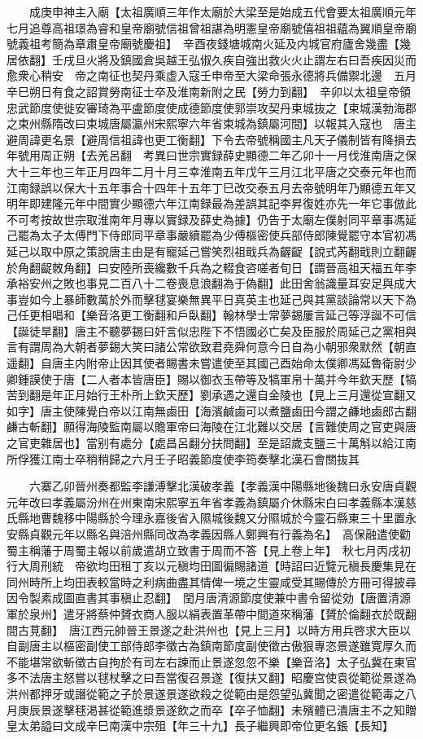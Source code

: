 　　成庚申神主入廟【太祖廣順三年作太廟於大梁至是始成五代會要太祖廣順元年七月追尊高祖璟為睿和皇帝廟號信祖曾祖諶為明憲皇帝廟號僖祖祖藴為翼順皇帝廟號義祖考簡為章肅皇帝廟號慶祖】　辛酉夜錢塘城南火延及内城官府廬舍幾盡【幾居依翻】壬戌旦火將及鎮國倉吳越王弘俶久疾自強出救火火止謂左右曰吾疾因災而愈衆心稍安　帝之南征也契丹乘虚入寇壬申帝至大梁命張永德將兵備禦北邊　五月辛巳朔日有食之詔賞勞南征士卒及淮南新附之民【勞力到翻】　辛卯以太祖皇帝領忠武節度使徙安審琦為平盧節度使成德節度使郭崇攻契丹束城抜之【束城漢勃海郡之束州縣隋改曰束城唐屬瀛州宋熙寧六年省束城為鎮屬河間】以報其入寇也　唐主避周諱更名景【避周信祖諱也更工衡翻】下令去帝號稱國主凡天子儀制皆有降損去年號用周正朔【去羌呂翻　考異曰世宗實録薛史顯德二年乙卯十一月伐淮南唐之保大十三年也三年正月四年二月十月三幸淮南五年戊午三月江北平唐之交泰元年也而江南録誤以保大十五年事合十四年十五年丁巳改交泰五月去帝號明年乃顯德五年又明年即建隆元年中間實少顯德六年江南録最為差誤其記李昇復姓亦先一年它事倣此不可考按故世宗取淮南年月專以實録及薛史為據】仍告于太廟左僕射同平章事馮延己罷為太子太傅門下侍郎同平章事嚴續罷為少傅樞密使兵部侍郎陳覺罷守本官初馮延己以取中原之策說唐主由是有寵延己嘗笑烈祖戢兵為齷齪【說式芮翻戢則立翻齷於角翻齪敇角翻】曰安陸所喪纔數千兵為之輟食咨嗟者旬日【謂晉高祖天福五年李承裕安州之敗也事見二百八十二卷喪息浪翻為于偽翻】此田舍翁識量耳安足與成大事豈如今上暴師數萬於外而擊毬宴樂無異平日真英主也延己與其黨談論常以天下為己任更相唱和【樂音洛更工衡翻和戶臥翻】翰林學士常夢錫屢言延己等浮誕不可信【誕徒旱翻】唐主不聽夢錫曰奸言似忠陛下不悟國必亡矣及臣服於周延己之黨相與言有謂周為大朝者夢錫大笑曰諸公常欲致君堯舜何意今日自為小朝邪衆默然【朝直遥翻】自唐主内附帝止因其使者賜書未嘗遣使至其國己酉始命太僕卿馮延魯衛尉少卿鍾謨使于唐【二人者本皆唐臣】賜以御衣玉帶等及犒軍帛十萬并今年欽天歷【犒苦到翻是年正月始行王朴所上欽天歷】劉承遇之還自金陵也【見上三月還從宣翻又如字】唐主使陳覺白帝以江南無鹵田【海濱鹹鹵可以煮鹽鹵田今謂之鹻地鹵郎古翻鹻古斬翻】願得海陵監南屬以贍軍帝曰海陵在江北難以交居【言難使周之官吏與唐之官吏雜居也】當别有處分【處昌呂翻分扶問翻】至是詔歲支鹽三十萬斛以給江南所俘獲江南士卒稍稍歸之六月壬子昭義節度使李筠奏擊北漢石會關抜其

　　六寨乙卯晉州奏都監李謙溥擊北漢破孝義【孝義漢中陽縣地後魏曰永安唐貞觀元年改曰孝義屬汾州在州東南宋熙寧五年省孝義為鎮屬介休縣宋白曰孝義縣本漢慈氏縣地曹魏移中陽縣於今理永嘉後省入隰城後魏又分隰城於今靈石縣東三十里置永安縣貞觀元年以縣名與涪州縣同改為孝義因縣人鄭興有行義為名】　高保融遣使勸蜀主稱藩于周蜀主報以前歲遣胡立致書于周而不答【見上卷上年】　秋七月丙戌初行大周刑統　帝欲均田租丁亥以元稹均田圖徧賜諸道【時詔曰近覽元稹長慶集見在同州時所上均田表較當時之利病曲盡其情俾一境之生靈咸受其賜傳於方冊可得披尋因令製素成圖直書其事稹止忍翻】　閏月唐清源節度使兼中書令留從効【唐置清源軍於泉州】遣牙將蔡仲贇衣商人服以絹表置革帶中間道來稱藩【贇於倫翻衣於既翻間古莧翻】　唐江西元帥晉王景遂之赴洪州也【見上三月】以時方用兵啓求大臣以自副唐主以樞密副使工部侍郎李徵古為鎮南節度副使徵古傲狠專恣景遂雖寛厚久而不能堪常欲斬徵古自拘於有司左右諫而止景遂忽忽不樂【樂音洛】太子弘冀在東官多不法唐主怒嘗以毬杖擊之曰吾當復召景遂【復扶又翻】昭慶宫使袁從範從景遂為洪州都押牙或譖從範之子於景遂景遂欲殺之從範由是怨望弘冀聞之密遣從範毒之八月庚辰景遂擊毬渇甚從範進漿景遂飲之而卒【卒子恤翻】未殯體已潰唐主不之知贈皇太弟謚曰文成辛巳南漢中宗殂【年三十九】長子繼興即帝位更名鋹【長知】

